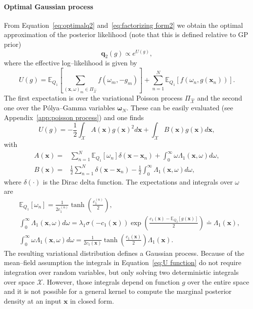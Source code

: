 \documentclass[twoside,11pt]{article}
\newcommand{\EE}[2]{\mathbb{E}_{#1}\left[ #2 \right]}
\newcommand{\bs}[1]{\boldsymbol{#1}}
\newcommand{\bx}{\boldsymbol{x}}
\newcommand{\bomega}{\boldsymbol{\omega}}
\newcommand{\X}{\mathcal{X}}
\begin{document}
\paragraph{Optimal Gaussian process}
From Equation~\eqref{eq:optimalq2} and~\eqref{eq:factorizing form2}
we obtain the optimal approximation of the posterior likelihood (note that this is defined relative to GP prior) \begin{equation}
\bs{q}_2(g) \propto e^{U(g)},
\end{equation}
where the effective log--likelihood is given by
\begin{equation}
U(g) =  \EE{Q_1}{\sum_{(\bx,\omega)_m\in\Pi_{\hat{\X}}}f(\omega_m,-g_m)}
+  \sum_{n=1}^N \EE{Q_1}{f(\omega_n,g(\bx_n))}.
\end{equation}
The first expectation is over the variational Poisson process $\Pi_{\hat{\X}}$ and the second one over the P\'olya--Gamma variables $\bomega_N$. These can be easily evaluated (see Appendix~\ref{app:poisson process}) and one finds
\begin{equation}\label{eq:U function}
U(g) =  -\frac{1}{2}\int_\X A(\bx) g(\bx)^2 d\bx + \int_\X B(\bx)g(\bx)d\bx,
\end{equation}
with
\begin{align}
A(\bx) = &  \sum_{n=1}^N \EE{Q_1}{\omega_n}\delta(\bx - \bx_n) + \int_0^\infty \omega \Lambda_{1}(\bx,\omega) d\omega,\\
B(\bx) = & \frac{1}{2} \sum_{n=1}^N \delta(\bx - \bx_n) - \frac{1}{2}\int_0^\infty \Lambda_1(\bx,\omega)
d\omega ,
\end{align}
where $\delta(\cdot)$ is the Dirac delta function. The expectations and integrals over $\omega$ are 
\begin{align}
&\EE{Q_1}{\omega_n} = \frac{1}{2c_1^{(n)}}\tanh\left(\frac{c_1^{(n)}}{2}\right),\\
&\int_0^\infty \Lambda_{1}(\bx,\omega) d\omega = \lambda_1 \sigma(-c_1(\bx))\exp\left(\frac{c_1(\bx) - \EE{Q_2}{g(\bx)}}{2}\right) \doteq \Lambda_1(\bx),  \\
&\int_0^\infty \omega \Lambda_{1}(\bx,\omega) d\omega = \frac{1}{2 c_{1}(\bx)}\tanh\left(\frac{c_{1}(\bx)}{2}\right)\Lambda_1(\bx).
\end{align}
The resulting variational distribution defines a Gaussian process. Because of the mean--field assumption the integrals in Equation~\eqref{eq:U function} do not require integration over random variables, but only solving two deterministic integrals over space $\X$. However, those integrals depend on function $g$ over the entire space and it is not possible for a general kernel to compute the marginal posterior density at an input $\bx$ in closed form. 
\end{document}
